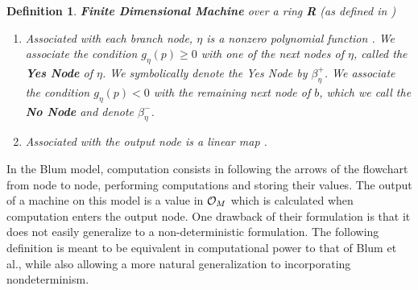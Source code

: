 \documentclass[twoside]{article}
\newtheorem{definition}{Definition}[section]
\begin{document}
\begin{definition}{\textbf{Finite Dimensional Machine} over a ring
    \textbf{R} (as defined in \cite{B98})}
\begin{enumerate}
  \item Associated with each branch node, $\eta$ is a nonzero
    polynomial function .  We
    associate the condition $g_\eta(p) \geq 0$ with one of the next
    nodes of $\eta$, called the \textbf{Yes Node} of $\eta$.  We
    symbolically denote the Yes Node by $\beta_\eta^+$. We associate
    the condition $g_\eta(p) < 0$ with the remaining next node of $b$,
    which we call the \textbf{No Node} and denote $\beta_\eta^-$.
    
  \item Associated with the output node is a linear map
    .
  \end{enumerate}
\end{definition}

In the Blum model, computation consists in following the arrows of the
flowchart from node to node, performing computations and storing their
values.  The output of a machine on this model is a value in
$\mathcal{O}_M$ which is calculated when computation enters the output
node. One drawback of their formulation is that it does not easily
generalize to a non-deterministic formulation.  The following
definition is meant to be equivalent in computational power to that of
Blum et al., while also allowing a more natural generalization to
incorporating nondeterminism.
\end{document}
